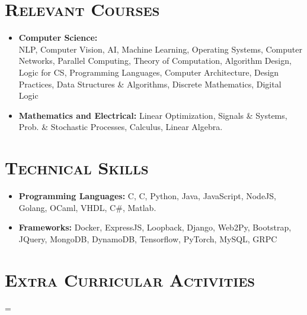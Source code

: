 \documentclass{article}
\newenvironment{longversion}{}{} %
\newenvironment{absolutelynopagebreak}
  {\par\nobreak\vfil\penalty0\vfilneg
   \vtop\bgroup}
  {\par\xdef\tpd{\the\prevdepth}\egroup
   \prevdepth=\tpd}
\newcommand{\CPP}
{C\nolinebreak[4]\hspace{-.05em}\raisebox{.22ex}{\footnotesize\bf ++}}
\newcommand{\tmpsection}[1]{}
\let\tmpsection=\section
\renewcommand{\section}[1]{\tmpsection*{\textsc{#1}}}
\begin{document}
\begin{absolutelynopagebreak}
\begin{longversion}

\end{longversion}

\begin{longversion}
\section{Relevant Courses}
\begin{itemize}
\setlength\itemsep{-1em}
\item \textbf{Computer Science:} \hfill \\
NLP, Computer Vision, AI, Machine Learning, Operating Systems, Computer Networks, Parallel Computing, Theory of Computation, Algorithm Design, Logic for CS, Programming Languages, Computer Architecture, Design Practices, Data Structures \& Algorithms, Discrete Mathematics, Digital Logic\\

\item \textbf{Mathematics and Electrical:}
Linear Optimization, Signals \& Systems, Prob. \& Stochastic Processes, Calculus, Linear Algebra.\\
\end{itemize}
\end{longversion}


\begin{longversion}
\section{Technical Skills}\begin{itemize}
\item \textbf{Programming Languages:}  C, \CPP, Python, Java, JavaScript, NodeJS, Golang, OCaml, VHDL, C\#, Matlab.
\item \textbf{Frameworks:} Docker, ExpressJS, Loopback, Django, Web2Py, Bootstrap, JQuery, MongoDB, DynamoDB, Tensorflow, PyTorch, MySQL, GRPC

\end{itemize}

\end{longversion}

\section{Extra Curricular Activities}



\end{absolutelynopagebreak}
\end{document}
